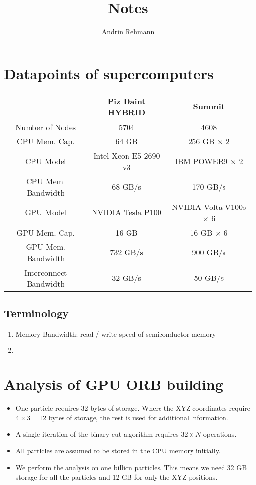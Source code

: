\documentclass[]{article}
\title{Notes}
\author{Andrin Rehmann}
\begin{document}
\maketitle

\section{Datapoints of supercomputers}

\begin{center}
	\begin{tabular}{ c c c }
		& Piz Daint HYBRID \cite{piz_daint} & Summit \\ 
		\hline
		Number of Nodes & 5704 & 4608\\
		CPU Mem. Cap. & 64 GB & 256 GB $\times$ 2  \\   
		CPU Model & Intel Xeon E5-2690 v3 & IBM POWER9 $\times$ 2 \\
		CPU Mem. Bandwidth  & 68 GB/s & 170 GB/s\\
		GPU Model & NVIDIA Tesla P100 & NVIDIA Volta V100s $\times$ 6 \\
		GPU Mem. Cap. & 16 GB & 16 GB $\times$ 6\\
		GPU Mem. Bandwidth & 732 GB/s & 900 GB/s \\
		Interconnect Bandwidth & 32 GB/s & 50 GB/s \\
	\end{tabular}
\end{center}

\subsection{Terminology}

\begin{enumerate}
	\item Memory Bandwidth: read / write speed of semiconductor memory
	\item 

\end{enumerate}

\section{Analysis of GPU ORB building}

\begin{itemize}
	\item 
	One particle requires 32 bytes of storage. Where the XYZ coordinates require $4\times3 = 12$ bytes of storage, the rest is used for additional information.
	
	\item
	A single iteration of the binary cut algorithm requires $32 \times N$ operations.
	
	\item 
	All particles are assumed to be stored in the CPU memory initially.
	
	\item
	We perform the analysis on one billion particles. This means we need 32 GB storage for all the particles and 12 GB for only the XYZ positions.
\end{itemize}
\end{document}
